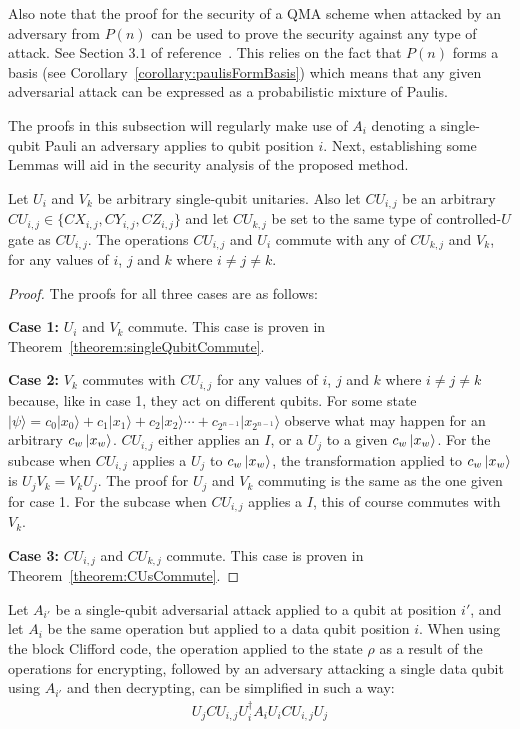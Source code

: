Also note that the proof for the security of a QMA scheme when attacked by an adversary from $P(n)$ can be used to prove the security against any type of attack. See Section $3.1$ of reference~\cite{aharonov2017interactive}. This relies on the fact that $P(n)$ forms a basis (see Corollary~\ref{corollary:paulisFormBasis}) which means that any given adversarial attack can be expressed as a probabilistic mixture of Paulis.

The proofs in this subsection will regularly make use of $A_i$ denoting a single-qubit Pauli an adversary applies to qubit position $i$. Next, establishing some Lemmas will aid in the security analysis of the proposed method. 
\begin{myLemmarep}
\label{lemma:commutingEncryptionOperators}
Let $U_i$ and $V_k$ be arbitrary single-qubit unitaries. Also let $\mathit{CU}_{i,j}$ be an arbitrary $\mathit{CU}_{i,j} \in \{\mathit{CX}_{i,j}, \mathit{CY}_{i,j}, \mathit{CZ}_{i,j}\}$ and let $\mathit{CU}_{k,j}$ be set to the same type of controlled-$U$ gate as $\mathit{CU}_{i,j}$. The operations $\mathit{CU}_{i,j}$ and $U_i$ commute with any of $\mathit{CU}_{k,j}$ and $V_k$, for any values of $i$, $j$ and $k$ where $i \neq j \neq k$.
\end{myLemmarep}
\begin{proof}
The proofs for all three cases are as follows:

\textbf{Case 1:} $U_i$ and $V_k$ commute. This case is proven in Theorem~\ref{theorem:singleQubitCommute}.

\textbf{Case 2:} $V_k$ commutes with $\mathit{CU}_{i,j}$ for any values of $i$, $j$ and $k$ where $i \neq j \neq k$ because, like in case 1, they act on different qubits. For some state $|\psi\rangle = c_0|x_0\rangle + c_1|x_1\rangle + c_2|x_2\rangle \cdots + c_{2^{n-1}}|x_{2^{n-1}}\rangle$ observe what may happen for an arbitrary $c_w\ket{x_w}$. $\mathit{CU}_{i,j}$ either applies an $I$, or a $U_j$ to a given $c_w\ket{x_w}$. For the subcase when $\mathit{CU}_{i,j}$ applies a $U_j$ to $c_w\ket{x_w}$, the transformation applied to $c_w\ket{x_w}$ is $U_jV_k = V_kU_j$. The proof for $U_j$ and $V_k$ commuting is the same as the one given for case 1. For the subcase when $\mathit{CU}_{i,j}$ applies a $I$, this of course commutes with $V_k$.

\textbf{Case 3:} $\mathit{CU}_{i,j}$ and $\mathit{CU}_{k,j}$ commute. This case is proven in Theorem~\ref{theorem:CUsCommute}.
\end{proof}
\begin{myLemmarep}
\label{lemma:integrityEncryptionRearrangement}
Let $A_{i'}$ be a single-qubit adversarial attack applied to a qubit at position $i'$, and let $A_i$ be the same operation but applied to a data qubit position $i$. When using the block Clifford code, the operation applied to the state $\rho$ as a result of the operations for encrypting, followed by an adversary attacking a single data qubit using $A_{i'}$ and then decrypting, can be simplified in such a way:
\begin{align}
U_{j} \mathit{CU}_{i,j}U_i^{\dagger}A_{i}U_i\mathit{CU}_{i,j} U_{j} \label{eq:integrityEncryptionRearrangement}
\end{align}
\end{myLemmarep}
